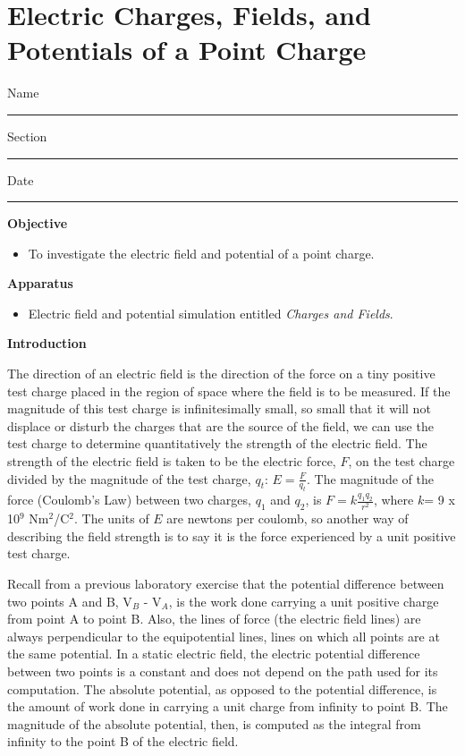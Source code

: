 
\section{Electric Charges, Fields, and Potentials of a Point Charge}

Name \rule{2.0in}{0.1pt}\hfill{}Section \rule{1.0in}{0.1pt}\hfill{}Date
\rule{1.0in}{0.1pt}

\textbf{Objective}

\begin{itemize}
\item To investigate the electric field and potential of a point charge.
\end{itemize}

\textbf{Apparatus}

\begin{itemize}
\item Electric field and potential simulation entitled {\it Charges and Fields}.
\end{itemize}

\textbf{Introduction}

The direction of an electric field is the direction of the force on
a tiny positive test charge placed in the region of space where the
field is to be measured. If the magnitude of this test charge is infinitesimally
small, so small that it will not displace or disturb the charges that
are the source of the field, we can use the test charge to determine
quantitatively the strength of the electric field. The strength of
the electric field is taken to be the electric force, $F$, on the test
charge divided by the magnitude of the test charge, \( q_{t} \):
\( E=\frac{F}{q_{t}} \). The magnitude of the force (Coulomb's Law) between two charges,
\( q_{1} \) and \( q_{2} \), is \( F=k\frac{q_{1}q_{2}}{r^{2}} \),
where \( k \)= 9 x 10\( ^{9} \) Nm\( ^{2} \)/C\( ^{2} \). The units
of \( E \) are newtons per coulomb, so another way of describing the field
strength is to say it is the force experienced by a unit positive
test charge.

Recall from a previous laboratory exercise that the potential difference
between two points A and B, V\( _{B} \) - V\( _{A} \), is the work
done carrying a unit positive charge from point A to point B. Also,
the lines of force (the electric field lines) are always perpendicular
to the equipotential lines, lines on which all points are at the same
potential. In a static electric field, the electric potential difference
between two points is a constant and does not depend on the path used
for its computation. The absolute potential, as opposed to the potential
difference, is the amount of work done in carrying a unit charge from
infinity to point B. The magnitude of the absolute potential, then,
is computed as the integral from infinity to the point B of the electric
field.

